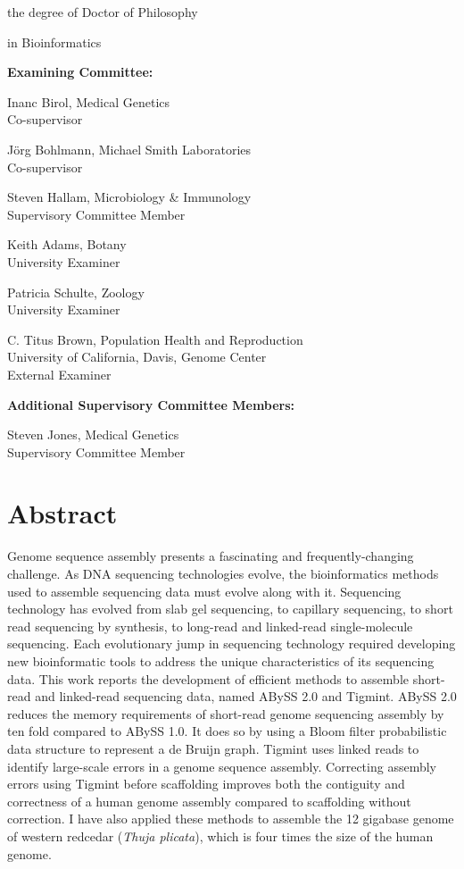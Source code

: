 \documentclass[
  12pt,
  oneside,
  openany]{book}
\begin{document}
the degree of Doctor of Philosophy

in Bioinformatics \vspace{5mm}

\textbf{Examining Committee:}

Inanc Birol, Medical Genetics\\
Co-supervisor

Jörg Bohlmann, Michael Smith Laboratories\\
Co-supervisor

Steven Hallam, Microbiology \& Immunology\\
Supervisory Committee Member

Keith Adams, Botany\\
University Examiner

Patricia Schulte, Zoology\\
University Examiner

C. Titus Brown, Population Health and Reproduction\\
University of California, Davis, Genome Center\\
External Examiner

\vspace{5mm}

\textbf{Additional Supervisory Committee Members:}

Steven Jones, Medical Genetics\\
Supervisory Committee Member

\newpage

\hypertarget{abstract}{%
\section*{Abstract}\label{abstract}}

Genome sequence assembly presents a fascinating and frequently-changing challenge. As DNA sequencing technologies evolve, the bioinformatics methods used to assemble sequencing data must evolve along with it. Sequencing technology has evolved from slab gel sequencing, to capillary sequencing, to short read sequencing by synthesis, to long-read and linked-read single-molecule sequencing. Each evolutionary jump in sequencing technology required developing new bioinformatic tools to address the unique characteristics of its sequencing data. This work reports the development of efficient methods to assemble short-read and linked-read sequencing data, named ABySS 2.0 and Tigmint. ABySS 2.0 reduces the memory requirements of short-read genome sequencing assembly by ten fold compared to ABySS 1.0. It does so by using a Bloom filter probabilistic data structure to represent a de Bruijn graph. Tigmint uses linked reads to identify large-scale errors in a genome sequence assembly. Correcting assembly errors using Tigmint before scaffolding improves both the contiguity and correctness of a human genome assembly compared to scaffolding without correction. I have also applied these methods to assemble the 12 gigabase genome of western redcedar (\emph{Thuja plicata}), which is four times the size of the human genome.
\end{document}
